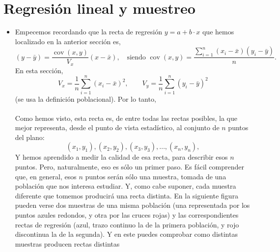\section{Regresión lineal y muestreo}

\begin{itemize}

    \item Empecemos recordando que la recta de regresión $y=a+b\cdot x$ que hemos localizado en la anterior sección es,
    \[(y-\bar y)=\dfrac{{\operatorname{cov}(x,y)}}{V_x}(x-\bar x), \quad\mbox{siendo }\operatorname{cov}(x,y)=\dfrac{\displaystyle\sum_{i=1}^{n}(x_i-\bar x)(y_i-\bar y)}{n}.\]
    En esta sección,
    \[V_x=\dfrac{1}{n}\sum_{i=1}^n(x_i-\bar x)^2,\qquad V_y=\dfrac{1}{n}\sum_{i=1}^n(y_i-\bar y)^2\]
    (se usa la definición poblacional). Por lo tanto,\\[3mm]
    \\[3mm]
    Como hemos visto, esta recta es, de entre todas las rectas posibles, la que mejor representa, desde el punto de vista estadístico, al conjunto de $n$ puntos del plano:
    \[(x_1,y_1),(x_2,y_2),(x_3,y_3),\ldots,(x_n,y_n),\]
    Y hemos aprendido a medir la calidad de esa recta, {\sf para describir esos $n$ puntos}. Pero, naturalmente, eso es sólo un primer paso. Es fácil comprender que, en general, esos $n$ puntos serán sólo una muestra, tomada de una población que nos interesa estudiar. Y, como cabe suponer, cada muestra diferente que tomemos producirá una recta distinta.  En la siguiente figura pueden verse dos muestras de una misma población (una representada por los puntos azules redondos, y otra por las cruces rojas) y las correspondientes rectas de regresión (azul, trazo continuo la de la primera población, y rojo discontinua la de la segunda). Y en este  puedes comprobar como distintas muestras producen rectas distintas

\end{itemize}
